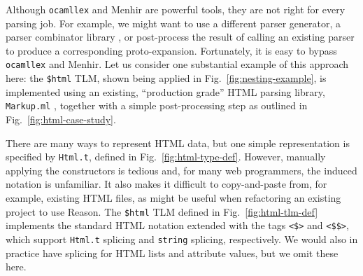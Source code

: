\documentclass[acmsmall,screen]{acmart}
\newcommand{\li}[1]{\lstinline[basicstyle=\ttfamily\fontsize{9pt}{1em}\selectfont]{#1}}
\begin{document}
Although \li{ocamllex} and Menhir are powerful tools, they are not right for every parsing job. For example, we might want to use a different parser generator, a parser combinator library \cite{Hutton1992d}, or post-process the result of calling an existing parser to produce a corresponding proto-expansion. Fortunately, it is easy to bypass \li{ocamllex} and Menhir. 
Let us consider one substantial example of this approach here: the \li{$html} TLM, shown being applied in Fig.~\ref{fig:nesting-example}, is implemented using an existing, ``production grade'' HTML parsing library, \li{Markup.ml} \cite{markupml}, together with a simple post-processing step as outlined in Fig.~\ref{fig:html-case-study}. 

There are many ways to represent HTML data, but one simple representation is specified by \li{Html.t}, defined in Fig.~\ref{fig:html-type-def}. However, manually applying the constructors is tedious and, for many web programmers, the induced notation is unfamiliar. It also makes it difficult to copy-and-paste from, for example, existing HTML files, as might be useful when refactoring an existing project to use Reason. 
The \li{$html} TLM defined in Fig.~\ref{fig:html-tlm-def} implements the standard HTML notation extended with the tags \li{<$>} and \li{<$$>}, which support \li{Html.t} splicing and \li{string} splicing, respectively. 
{We would also in practice have splicing for HTML lists and attribute values, but we omit these here.}
\end{document}

